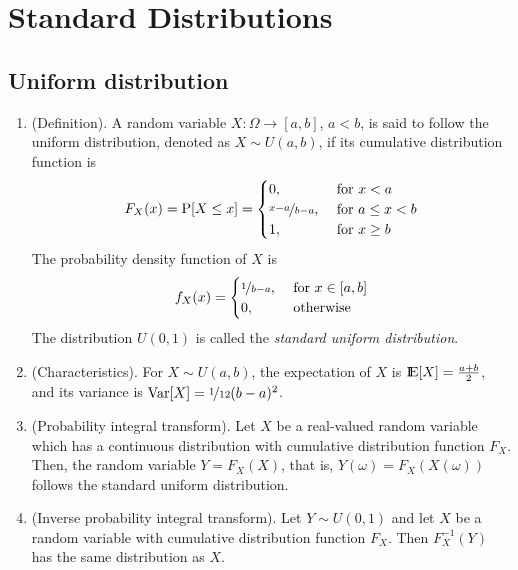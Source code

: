 \documentclass[a4paper,10pt]{scrbook}
\begin{document}
\section{Standard Distributions}
\subsection{Uniform distribution}
\begin{enumerate}
 \item (Definition). A random variable \(X:\Omega\to[a,b]\), \(a<b\), is said to follow the 
       uniform distribution, denoted as \(X\sim U(a,b)\), if its cumulative distribution 
       function is
       \[
        F_X(x) = \mathrm{P}[X \leq x] = \begin{cases}
                                    0,&\text{ for } x<a\\
                                    \nicefrac{x-a}{b-a},&\text{ for } a \leq x < b\\
                                    1,&\text{ for } x\geq b\\
                                   \end{cases}
       \]
       The probability density function of \(X\) is
       \[
        f_X(x) = \begin{cases}
                  \nicefrac{1}{b-a},&\text{ for } x\in [a,b]\\
                  0,&\text{ otherwise}
                 \end{cases}
       \]
       The distribution \(U(0,1)\) is called the \textit{standard uniform distribution}.
 \item (Characteristics). For \(X\sim U(a,b)\), the expectation of \(X\) is \(\E[X] = \frac{a+b}{2}\), 
       and its variance is \(\mathrm{Var}[X] = \nicefrac{1}{12}(b-a)^2\).
 \item (Probability integral transform). Let \(X\) be a real-valued random variable which has 
       a continuous distribution with cumulative distribution function \(F_X\). Then, the random 
       variable \(Y = F_X(X)\), that is, \(Y(\omega) = F_X(X(\omega))\) follows the standard 
       uniform distribution.
 \item (Inverse probability integral transform). Let \(Y\sim U(0,1)\) and let \(X\) be a 
       random variable with cumulative distribution function \(F_X\). Then \(F_X^{-1}(Y)\) 
       has the same distribution as \(X\).
\end{enumerate}
\end{document}
